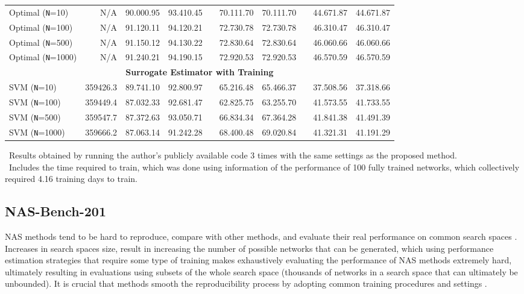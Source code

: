 \documentclass[10pt, conference]{IEEEtran}
\begin{document}
\begin{table*}[htb]
{\begin{tabular}{@{}lr@{\hskip 0.15in}llcllcll@{}}
\midrule
Optimal (\texttt{N}=10)  & N/A & 90.000.95 & 93.410.45  && 70.111.70  & 70.111.70   && 44.671.87       & 44.671.87 \\
			Optimal (\texttt{N}=100) & N/A & 91.120.11 & 94.120.21  && 72.730.78  & 72.730.78   && 46.310.47       & 46.310.47 \\
			Optimal (\texttt{N}=500) & N/A & 91.150.12 & 94.130.22  && 72.830.64  & 72.830.64   && 46.060.66       & 46.060.66 \\
			Optimal (\texttt{N}=1000)& N/A & 91.240.21 & 94.190.15  && 72.920.53  & 72.920.53   && 46.570.59       & 46.570.59 \\ 
			\midrule
			\midrule
			\multicolumn{10}{c}{\textbf{Surrogate Estimator with Training}}\\
			SVM (\texttt{N}=10)   & 359426.3  & 89.741.10 & 92.800.97  && 65.216.48  & 65.466.37   && 37.508.56       & 37.318.66 \\
			SVM (\texttt{N}=100)  & 359449.4 & 87.032.33 & 92.681.47  && 62.825.75  & 63.255.70   && 41.573.55       & 41.733.55 \\
			SVM (\texttt{N}=500)  & 359547.7& 87.372.63 & 93.050.71  && 66.834.34  & 67.364.28   && 41.841.38       & 41.491.39 \\
			SVM (\texttt{N}=1000) & 359666.2& 87.063.14 & 91.242.28  && 68.400.48  & 69.020.84   && 41.321.31       & 41.191.29 \\ 
			\midrule
		\end{tabular}
	}
	~Results obtained by running the author's publicly available code 3 times with the same settings as the proposed method.\\
	~Includes the time required to train, which was done using information of the performance of 100 fully trained networks, which collectively required 4.16 training days to train.
\end{table*}

\FloatBarrier


\subsection{NAS-Bench-201}
NAS methods tend to be hard to reproduce, compare with other methods, and evaluate their real performance on common search spaces \cite{lindauer2020best}. Increases in search spaces size, result in increasing the number of possible networks that can be generated, which using performance estimation strategies that require some type of training makes exhaustively evaluating the performance of NAS methods extremely hard, ultimately resulting in evaluations using subsets of the whole search space (thousands of networks in a search space that can ultimately be unbounded). It is crucial that methods smooth the reproducibility process by adopting common training procedures and settings \cite{lindauer2020best}.
\end{document}
